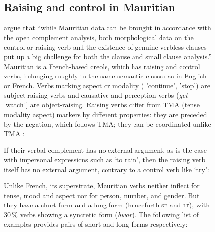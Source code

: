\documentclass[output=paper
                ,modfonts
                ,nonflat
	        ,collection
	        ,collectionchapter
	        ,collectiontoclongg
 	        ,biblatex
                ,babelshorthands
                ,newtxmath
                ,draftmode
                ,colorlinks, citecolor=brown
]{./langsci/langscibook}
\begin{document}
\begin{figure}
\subsection{Raising and control in Mauritian}

\citet[]{HenriandLaurens2011} argue that ``while Mauritian data can be brought in accordance with the open complement analysis, both morphological data on the control or raising verb and the existence of genuine verbless clauses put up a big challenge for both the clause and small clause analysis.''
Mauritian is a French-based creole, which has raising and control verbs, belonging roughly to the same semantic classes as in English or French. Verbs marking aspect or
modality ( 'continue',  'stop') are subject-raising verbs and causative and perception verbs (\emph{get} 'watch') are
object-raising. Raising verbs differ from TMA (tense modality aspect) markers by different properties: they are preceded by
the negation, which follows TMA; they can be coordinated unlike TMA \citep[]{HenriandLaurens2011}:

\eal
{}
\zl
 
If their verbal complement has no external argument, as is the case with impersonal expressions such as  `to rain', then the raising verb itself has no external argument, contrary to a control verb like  `try':

\eal
{}
\zl

Unlike French, its superstrate, Mauritian verbs neither inflect for tense, mood and aspect nor for person, number, and
gender. But they have a short form and a long form (henceforth \textsc{sf} and \textsc{lf}), with
30\,\% verbs showing a syncretic form (\emph{bwar}). The following list of examples provides pairs of short and
long forms respectively:


\end{figure}
\end{document}
